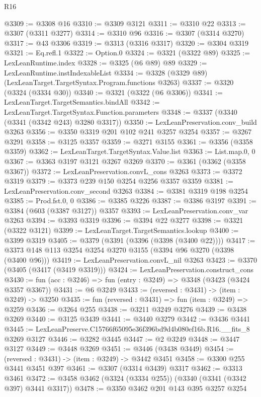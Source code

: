\begin{lexlean}{R16}
\begin{coremodule}
@3309 := @3308 @16
@3310 := @3309 @3121
@3311 := @3310 @22
@3313 := @3307 (@3311 @3277)
@3314 := @3310 @96
@3316 := @3307 (@3314 @3270)
@3317 := @43 @3306
@3319 := @3313 (@3316 @3317)
@3320 := @3304 @3319
@3321 := Eq.refl.{1}
@3322 := Option.{0}
@3324 := @3321 (@3322 @89)
@3325 := LexLeanRuntime.index
@3328 := @3325 (@6 @89) @89
@3329 := LexLeanRuntime.instIndexableList
@3334 := @3328 (@3329 @89) (LexLeanTarget.TargetSyntax.Program.functions @3263)
@3337 := @3320 (@3324 (@3334 @30))
@3340 := @3321 (@3322 (@6 @3306))
@3341 := LexLeanTarget.TargetSemantics.bindAll
@3342 := LexLeanTarget.TargetSyntax.Function.parameters
@3348 := @3337 (@3340 (@3341 (@3342 @243) @3280 @3317))
@3350 := LexLeanPreservation.conv_build @3263
@3356 := @3350 @3319 @201 @102 @241 @3257 @3254
@3357 := @3267 @3291
@3358 := @3125 @3357
@3359 := @3271 @3155
@3361 := @3356 (@3358 @3359)
@3362 := LexLeanTarget.TargetSyntax.Value.list
@3363 := List.map.{0, 0}
@3367 := @3363 @3197 @3121 @3267 @3269
@3370 := @3361 (@3362 (@3358 @3367))
@3372 := LexLeanPreservation.convL_cons @3263
@3373 := @3372 @3319
@3379 := @3373 @239 @150 @3254 @3256 @3357 @3359
@3381 := LexLeanPreservation.conv_second @3263
@3384 := @3381 @3319 @198 @3254
@3385 := Prod.fst.{0, 0}
@3386 := @3385 @3226
@3387 := @3386 @3197
@3391 := @3384 (@603 (@3387 @3127)) @3357
@3393 := LexLeanPreservation.conv_var @3263
@3394 := @3393 @3319
@3396 := @3394 @22 @3277
@3398 := @3321 (@3322 @3121)
@3399 := LexLeanTarget.TargetSemantics.lookup
@3400 := @3399 @3319
@3405 := @3379 (@3391 (@3396 (@3398 (@3400 @22))))
@3417 := @3373 @148 @113 @3254 @3254 @3270 @3155 (@3394 @96 @3270 (@3398 (@3400 @96)))
@3419 := LexLeanPreservation.convL_nil @3263
@3423 := @3370 (@3405 (@3417 (@3419 @3319)))
@3424 := LexLeanPreservation.construct_cons
@3430 := fun (acc : @3246) => fun (entry : @3249) => @3348 (@3423 (@3424 @3357 @3367))
@3431 := @6 @3249
@3433 := (reversed : @3431) -> (item : @3249) -> @3250
@3435 := fun (reversed : @3431) => fun (item : @3249) => @3259
@3436 := @3264 @255
@3438 := @3211 @3249 @3276
@3439 := @3438 @3269
@3440 := @3125 @3439
@3441 := @3440 @3279
@3442 := @3436 @3441
@3445 := LexLeanPreserve.C15766f65095e36f396bd9d4b080ef16b.R16.__fits_8 @3269 @3127
@3446 := @3282 @3445
@3447 := @2 @3249
@3448 := @3447 @3127
@3449 := @3448 @3269
@3451 := @3446 (@3438 @3449)
@3454 := (reversed : @3431) -> (item : @3249) -> @3442 @3451
@3458 := @3300 @255 @3441 @3451 @397
@3461 := @3307 (@3314 @3439) @3317
@3462 := @3313 @3461
@3472 := @3458 @3462 (@3324 (@3334 @255)) (@3340 (@3341 (@3342 @397) @3441 @3317))
@3478 := @3350 @3462 @201 @143 @395 @3257 @3254

\end{coremodule}
\end{lexlean}
